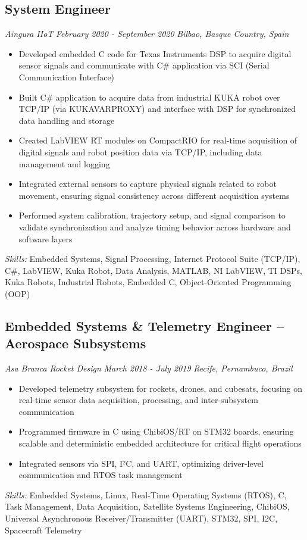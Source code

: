 \documentclass[11pt,a4paper]{article}
\begin{document}
\subsection{System Engineer}
\textit{Aingura IIoT} \hfill \textit{February 2020 - September 2020}
\textit{Bilbao, Basque Country, Spain}
\begin{itemize}
    \item Developed embedded C code for Texas Instruments DSP to acquire digital sensor signals and communicate with C\# application via SCI (Serial Communication Interface)
    \item Built C\# application to acquire data from industrial KUKA robot over TCP/IP (via KUKAVARPROXY) and interface with DSP for synchronized data handling and storage
    \item Created LabVIEW RT modules on CompactRIO for real-time acquisition of digital signals and robot position data via TCP/IP, including data management and logging
    \item Integrated external sensors to capture physical signals related to robot movement, ensuring signal consistency across different acquisition systems
    \item Performed system calibration, trajectory setup, and signal comparison to validate synchronization and analyze timing behavior across hardware and software layers
\end{itemize}
\textit{Skills:} Embedded Systems, Signal Processing, Internet Protocol Suite (TCP/IP), C\#, LabVIEW, Kuka Robot, Data Analysis, MATLAB, NI LabVIEW, TI DSPs, Kuka Robots, Industrial Robots, Embedded C, Object-Oriented Programming (OOP)

\subsection{Embedded Systems \& Telemetry Engineer – Aerospace Subsystems}
\textit{Asa Branca Rocket Design} \hfill \textit{March 2018 - July 2019}
\textit{Recife, Pernambuco, Brazil}
\begin{itemize}
    \item Developed telemetry subsystem for rockets, drones, and cubesats, focusing on real-time sensor data acquisition, processing, and inter-subsystem communication
    \item Programmed firmware in C using ChibiOS/RT on STM32 boards, ensuring scalable and deterministic embedded architecture for critical flight operations
    \item Integrated sensors via SPI, I²C, and UART, optimizing driver-level communication and RTOS task management
\end{itemize}
\textit{Skills:} Embedded Systems, Linux, Real-Time Operating Systems (RTOS), C, Task Management, Data Acquisition, Satellite Systems Engineering, ChibiOS, Universal Asynchronous Receiver/Transmitter (UART), STM32, SPI, I2C, Spacecraft Telemetry
\end{document}
